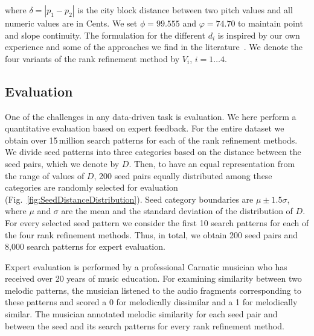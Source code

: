 \noindent where $\delta = |p_1-p_2|$ is the city block distance between two pitch values and all numeric values are in Cents. We set $\phi =99.555$ and $\varphi = 74.70$ to maintain point and slope continuity. The formulation for the different $d_i$ is inspired by our own experience and some of the approaches we find in the literature~\cite{Ishwar2013,Rao2014}. We denote the four variants of the rank refinement method by $V_i$, $i=1\dots 4$.

\subsection{Evaluation}


One of the challenges in any data-driven task is evaluation. We here perform a quantitative evaluation based on expert feedback. For the entire dataset we obtain over 15\,million search patterns for each of the rank refinement methods. We divide seed patterns into three categories based on the distance between the seed pairs, which we denote by $D$. Then, to have an equal representation from the range of values of $D$, 200 seed pairs equally distributed among these categories are randomly selected for evaluation (Fig.~\ref{fig:SeedDistanceDistribution}). Seed category boundaries are $\mu \pm 1.5\sigma$, where $\mu$ and $\sigma$ are the mean and the standard deviation of the distribution of $D$. For every selected seed pattern we consider the first 10 search patterns for each of the four rank refinement methods. Thus, in total, we obtain 200 seed pairs and 8,000 search patterns for expert evaluation.

Expert evaluation is performed by a professional Carnatic musician who has received over 20 years of music education. For examining similarity between two melodic patterns, the musician listened to the audio fragments corresponding to these patterns and scored a 0 for melodically dissimilar and a 1 for melodically similar. The musician annotated melodic similarity for each seed pair and between the seed and its search patterns for every rank refinement method.


